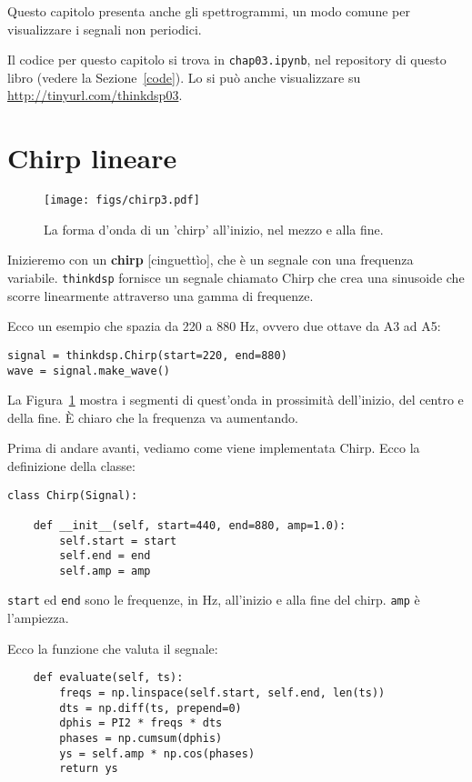 \documentclass[12pt,a4paper]{book}
\begin{document}
Questo capitolo presenta anche gli spettrogrammi, un modo comune per visualizzare i segnali non periodici.

Il codice per questo capitolo si trova in {\tt chap03.ipynb}, nel repository di questo libro (vedere la Sezione~\ref{code}). Lo si può anche visualizzare su \url{http://tinyurl.com/thinkdsp03}.

\section{Chirp lineare} 

\begin{figure} 

\centerline{\texttt{[image: figs/chirp3.pdf]}} \caption{La forma d'onda di un 'chirp' all'inizio, nel mezzo e alla fine.} \label{fig.chirp3} \end{figure} 

Inizieremo con un {\bf chirp} [cinguettìo], che è un segnale con una frequenza variabile. {\tt thinkdsp} fornisce un segnale chiamato Chirp che crea una sinusoide che scorre linearmente attraverso una gamma di frequenze.

Ecco un esempio che spazia da 220 a 880 Hz, ovvero due ottave da A3 ad A5:

\begin{verbatim} 
signal = thinkdsp.Chirp(start=220, end=880)
wave = signal.make_wave()
 \end{verbatim} 

La Figura~\ref{fig.chirp3} mostra i segmenti di quest'onda in prossimità dell'inizio, del centro e della fine. È chiaro che la frequenza va aumentando.

Prima di andare avanti, vediamo come viene implementata Chirp. Ecco la definizione della classe:

\begin{verbatim} 
class Chirp(Signal):

    def __init__(self, start=440, end=880, amp=1.0):
        self.start = start
        self.end = end
        self.amp = amp
 \end{verbatim} 

{\tt start} ed {\tt end} sono le frequenze, in Hz, all'inizio e alla fine del chirp. {\tt amp} è l'ampiezza.

Ecco la funzione che valuta il segnale:

\begin{verbatim} 
    def evaluate(self, ts):
        freqs = np.linspace(self.start, self.end, len(ts))
        dts = np.diff(ts, prepend=0)
        dphis = PI2 * freqs * dts
        phases = np.cumsum(dphis)
        ys = self.amp * np.cos(phases)
        return ys
 \end{verbatim} 
\end{document}
